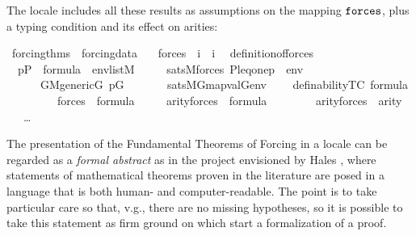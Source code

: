 The locale  includes all these results as assumptions on the
mapping $\mathop{\mathtt{forces}}$, plus a typing condition  and its
effect on arities:
\begin{isabelle}
\isamarkupfalse%
\ forcing{\isacharunderscore}thms\ {\isacharequal}\ forcing{\isacharunderscore}data\ {\isacharplus}\isanewline
\ \ forces\ {\isacharcolon}{\isacharcolon}\ {\isachardoublequoteopen}i\ {\isasymRightarrow}\ i{\isachardoublequoteclose}\isanewline
\ \
definition{\isacharunderscore}of{\isacharunderscore}forces{\isacharcolon}\isanewline 
\ \ {\isachardoublequoteopen}p{\isasymin}P\ {\isasymLongrightarrow}\ {\isasymphi}{\isasymin}formula\ {\isasymLongrightarrow}\ env{\isasymin}list{\isacharparenleft}M{\isacharparenright}\ {\isasymLongrightarrow}\isanewline
\ \ \ \  sats{\isacharparenleft}M{\isacharcomma}forces{\isacharparenleft}{\isasymphi}{\isacharparenright}{\isacharcomma}\ {\isacharbrackleft}P{\isacharcomma}leq{\isacharcomma}one{\isacharcomma}p{\isacharbrackright}\ {\isacharat}\ env{\isacharparenright}\ {\isasymlongleftrightarrow}\isanewline
\ \ \ \ \ \
{\isacharparenleft}{\isasymforall}G{\isachardot}{\isacharparenleft}M{\isacharunderscore}generic{\isacharparenleft}G{\isacharparenright}{\isasymand}\
p{\isasymin}G{\isacharparenright}\ {\isasymlongrightarrow}\isanewline 
\ \ \ \ \ \ sats{\isacharparenleft}M{\isacharbrackleft}G{\isacharbrackright}{\isacharcomma}{\isasymphi}{\isacharcomma}map{\isacharparenleft}val{\isacharparenleft}G{\isacharparenright}{\isacharcomma}env{\isacharparenright}{\isacharparenright}{\isacharparenright}{\isachardoublequoteclose}\isanewline
\ \ \isakeyword{and}\ \ definability{\isacharbrackleft}TC{\isacharbrackright}{\isacharcolon}\ {\isachardoublequoteopen}{\isasymphi}{\isasymin}formula\ {\isasymLongrightarrow}\isanewline
\ \ \ \ \ \ \ \ \  forces{\isacharparenleft}{\isasymphi}{\isacharparenright}\ {\isasymin}\ formula{\isachardoublequoteclose}\isanewline
\ \ \isakeyword{and}\ \ \ arity{\isacharunderscore}forces{\isacharcolon}\ \ {\isachardoublequoteopen}{\isasymphi}{\isasymin}formula\ {\isasymLongrightarrow}\isanewline
\ \ \ \ \ \ \
arity{\isacharparenleft}forces{\isacharparenleft}{\isasymphi}{\isacharparenright}{\isacharparenright}\
{\isacharequal}\ arity{\isacharparenleft}{\isasymphi}{\isacharparenright}\ {\isacharhash}{\isacharplus}\ {}{\isachardoublequoteclose}\isanewline
\ \ \isakeyword{and}\ \dots
\end{isabelle}

The presentation of the Fundamental Theorems of Forcing in a locale
can be regarded as a \emph{formal abstract} as in the project
envisioned by Hales \cite{hales-fabstracts}, where  statements of
mathematical theorems proven in the literature are posed in a language
that is both human- and computer-readable. The point is to take
particular care so that, v.g., there are no missing hypotheses, so it
is possible to take this statement as firm ground on which start a
formalization of a proof. 


